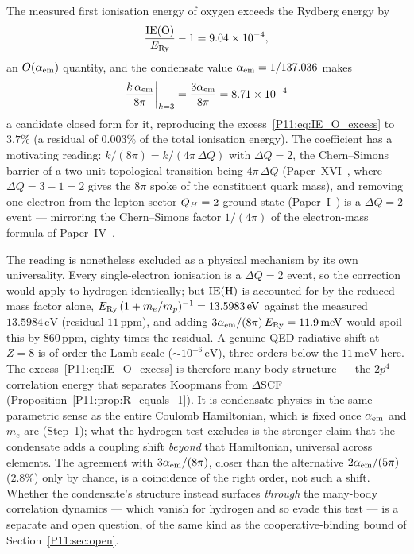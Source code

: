 \begin{remark}
\label{P11:rem:oalpha_excess}
The measured first ionisation energy of oxygen exceeds the Rydberg
energy by
\begin{equation}
  \frac{\mathrm{IE}(\mathrm{O})}{E_{\mathrm{Ry}}} - 1 = 9.04\times10^{-4},
  \label{P11:eq:IE_O_excess}
\end{equation}
an $O(\alpha_{\mathrm{em}})$ quantity, and the condensate value $\alpha_{\mathrm{em}} = 1/137.036$
makes
\begin{equation}
  \frac{k\,\alpha_{\mathrm{em}}}{8\pi}\bigg|_{k=3} = \frac{3\alpha_{\mathrm{em}}}{8\pi} = 8.71\times10^{-4}
  \label{P11:eq:IE_O_closed}
\end{equation}
a candidate closed form for it, reproducing the
excess~\eqref{P11:eq:IE_O_excess} to $3.7\%$ (a residual of $0.003\%$
of the total ionisation energy).  The coefficient has a motivating
reading: $k/(8\pi) = k/(4\pi\,\Delta Q)$ with $\Delta Q = 2$, the
Chern--Simons barrier of a two-unit topological transition being
$4\pi\,\Delta Q$ (Paper~XVI~\cite{Paper16}, where $\Delta Q = 3-1 = 2$
gives the $8\pi$ spoke of the constituent quark mass), and removing one
electron from the lepton-sector $Q_H=2$ ground state
(Paper~I~\cite{Paper1}) is a $\Delta Q = 2$ event --- mirroring the
Chern--Simons factor $1/(4\pi)$ of the electron-mass formula of
Paper~IV~\cite{Paper4}.

The reading is nonetheless excluded as a physical mechanism by its own
universality.  Every single-electron ionisation is a $\Delta Q = 2$
event, so the correction would apply to hydrogen identically; but
$\mathrm{IE}(\mathrm{H})$ is accounted for by the reduced-mass factor alone,
$E_{\mathrm{Ry}}\,(1+m_e/m_p)^{-1} = 13.5983\,\mathrm{eV}$ against the measured
$13.5984\,\mathrm{eV}$ (residual $11\,\mathrm{ppm}$), and adding
$3\alpha_{\mathrm{em}}/(8\pi)\,E_{\mathrm{Ry}} = 11.9\,\mathrm{meV}$ would spoil this by
$860\,\mathrm{ppm}$, eighty times the residual.  A genuine QED
radiative shift at $Z=8$ is of order the Lamb scale
($\sim10^{-6}\,\mathrm{eV}$), three orders below the $11\,\mathrm{meV}$
here.  The excess~\eqref{P11:eq:IE_O_excess} is therefore many-body
structure --- the $2p^4$ correlation energy that separates Koopmans
from $\Delta$SCF (Proposition~\ref{P11:prop:R_equals_1}).  It is
condensate physics in the same parametric sense as the entire Coulomb
Hamiltonian, which is fixed once $\alpha_{\mathrm{em}}$ and $m_e$ are
(Step~1); what the hydrogen test excludes is the stronger claim that
the condensate adds a coupling shift \emph{beyond} that Hamiltonian,
universal across elements.  The agreement with $3\alpha_{\mathrm{em}}/(8\pi)$, closer
than the alternative $2\alpha_{\mathrm{em}}/(5\pi)$ ($2.8\%$) only by chance, is a
coincidence of the right order, not such a shift.  Whether the
condensate's structure instead surfaces \emph{through} the many-body
correlation dynamics --- which vanish for hydrogen and so evade this
test --- is a separate and open question, of the same kind as the
cooperative-binding bound of Section~\ref{P11:sec:open}.
\end{remark}

